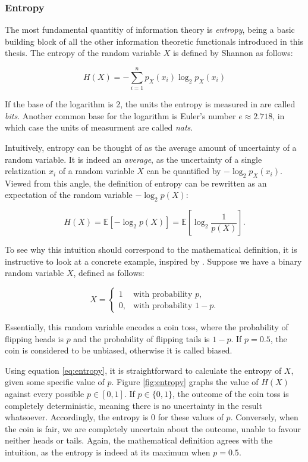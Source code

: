 \documentclass[12pt]{article}
\begin{document}
\subsubsection{Entropy}

The most fundamental quantitiy of information theory is \textit{entropy}, being a basic building block of all the other information theoretic functionals introduced in this thesis. The entropy of the random variable $X$ is defined by Shannon \cite{shannon} as follows: 

\begin{equation}
H(X) = -\sum_{i=1}^{n} p_X(x_i) \log_2 p_X(x_i)
\label{eq:entropy}
\end{equation}

If the base of the logarithm is 2, the units the entropy is measured in are called \textit{bits}. Another common base for the logarithm is Euler's number $e \approx 2.718$, in which case the units of measurment are called \textit{nats}.

Intuitively, entropy can be thought of as the average amount of uncertainty of a random variable. It is indeed an \textit{average}, as the uncertainty of a single relatization $x_i$ of a random variable $X$ can be quantified by $-\log_2 p_X(x_i)$. Viewed from this angle, the definition of entropy can be rewritten as an expectation of the random variable $-\log_2 p(X)$: 

$$H(X) = \mathbb{E} \left[ - \log_2 p(X) \right] = \mathbb{E} \left[ \log_2 \frac{1}{p(X)} \right].$$

To see why this intuition should correspond to the mathematical definition, it is instructive to look at a concrete example, inspired by \cite{cover-thomas}. Suppose we have a binary random variable $X$, defined as follows: 

$$X = \begin{cases} 1 & \mbox{with probability } p, \\ 0, & \mbox{with probability } 1-p. \end{cases}$$

Essentially, this random variable encodes a coin toss, where the probability of flipping heads is $p$ and the probability of flipping tails is $1-p$. If $p=0.5$, the coin is considered to be unbiased, otherwise it is called biased.

Using equation \ref{eq:entropy}, it is straightforward to calculate the entropy of $X$, given some specific value of $p$. Figure \ref{fig:entropy} graphs the value of $H(X)$ against every possible $p \in \left[ 0, 1 \right]$. If $p \in \{0, 1\}$, the outcome of the coin toss is completely deterministic, meaning there is no uncertainty in the result whatsoever. Accordingly, the entropy is 0 for these values of $p$. Conversely, when the coin is fair, we are completely uncertain about the outcome, unable to favour neither heads or tails. Again, the mathematical definition agrees with the intuition, as the entropy is indeed at its maximum when $p = 0.5$.
\end{document}
